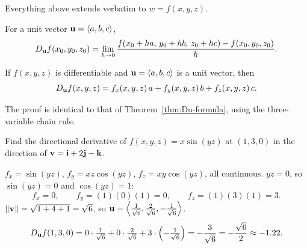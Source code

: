 Everything above extends verbatim to $w=f(x,y,z)$.

\begin{definition}
For a unit vector $\mathbf{u}=\left\langle a,b,c \right\rangle$,
\[
  D_{\mathbf{u}} f(x_0,y_0,z_0)=\lim_{h\to0}\frac{f(x_0+ha,\,y_0+hb,\,z_0+hc)-f(x_0,y_0,z_0)}{h}.
\]
\end{definition}

\begin{theorem}\label{thm:Du3}
If $f(x,y,z)$ is differentiable and $\mathbf{u}=\left\langle a,b,c \right\rangle$ is a unit vector, then
\[
  D_{\mathbf{u}} f(x,y,z)=f_x(x,y,z)\,a+f_y(x,y,z)\,b+f_z(x,y,z)\,c .
\]
\end{theorem}
The proof is identical to that of Theorem~\ref{thm:Du-formula}, using the
three-variable chain rule.

\begin{example}\label{ex:3var}
Find the directional derivative of $f(x,y,z)=x\sin(yz)$ at $(1,3,0)$ in the
direction of $\mathbf{v}=\mathbf{i}+2\mathbf{j}-\mathbf{k}$.
\end{example}
\begin{solution}
 $f_x=\sin(yz)$, $f_y=xz\cos(yz)$, $f_z=xy\cos(yz)$, all continuous.
 $yz=0$, so $\sin(yz)=0$ and $\cos(yz)=1$:
\[
  f_x=0,\qquad f_y=(1)(0)(1)=0,\qquad f_z=(1)(3)(1)=3 .
\]
 $\lVert\mathbf{v}\rVert=\sqrt{1+4+1}=\sqrt6$, so
$\mathbf{u}=\left\langle \tfrac{1}{\sqrt6},\tfrac{2}{\sqrt6},-\tfrac{1}{\sqrt6} \right\rangle$.
\[
  D_{\mathbf{u}} f(1,3,0)=0\cdot\tfrac{1}{\sqrt6}+0\cdot\tfrac{2}{\sqrt6}+3\cdot\left(-\tfrac{1}{\sqrt6}\right)
  =-\frac{3}{\sqrt6}=-\frac{\sqrt6}{2}\approx-1.22 .
\]
\end{solution}
